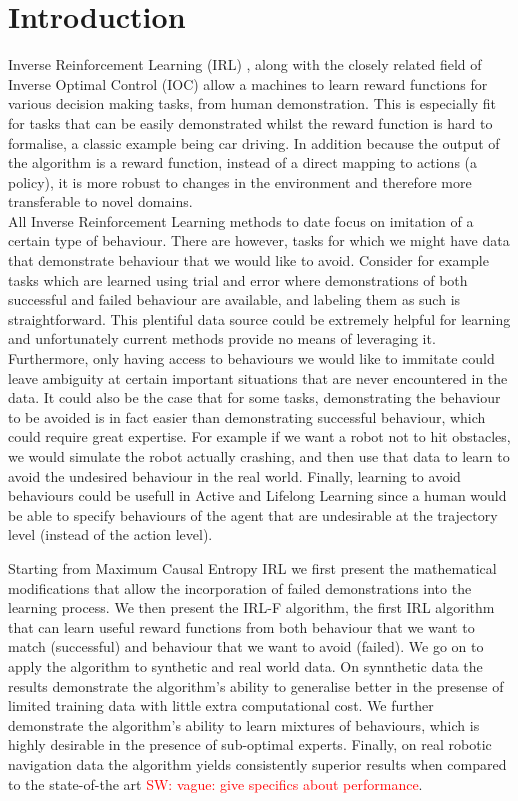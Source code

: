 \documentclass[letterpaper]{article}
\newcommand{\sw}[1]{\textcolor{red}{SW: #1}}
\newcommand{\sw}[1]{}
\begin{document}
\section{Introduction}
	Inverse Reinforcement Learning (IRL) \cite{ng2000algorithms}, along with the closely related field of Inverse Optimal Control (IOC) allow a machines to learn reward functions for various decision making tasks, from human demonstration.  This is especially fit for tasks that can be easily demonstrated whilst the reward function is hard to formalise, a classic example being car driving. In addition because the output of the algorithm is a reward function, instead of a direct mapping to actions (a policy), it is more robust to changes in the environment and therefore more transferable to novel domains.\\
	All Inverse Reinforcement Learning methods to date focus on imitation of a certain type of behaviour. There are however, tasks for which we might have data that demonstrate behaviour that we would like to avoid. Consider for example tasks which are learned using trial and error where demonstrations of both successful and failed behaviour are available, and labeling them as such is straightforward. This plentiful data source could be extremely helpful for learning and unfortunately current methods provide no means of leveraging it. Furthermore, only having access to behaviours we would like to immitate could leave ambiguity at certain important situations that are never encountered in the data. It could also be the case that for some tasks, demonstrating the behaviour to be avoided is in fact easier than demonstrating successful behaviour, which could require great expertise. For example if we want a robot not to hit obstacles, we would simulate the robot actually crashing, and then use that data to learn to avoid the undesired behaviour in the real world. Finally, learning to avoid behaviours could be usefull in Active and Lifelong Learning since a human would be able to specify behaviours of the agent that are undesirable at the trajectory level (instead of the action level). 

	 Starting from Maximum Causal Entropy IRL \cite{ziebart2010modelingthesis} we first present the mathematical modifications that allow the incorporation of failed demonstrations into the learning process. We then present the IRL-F algorithm, the first IRL algorithm that can learn useful reward functions from both behaviour that we want to match (successful) and behaviour that we want to avoid (failed). We go on to apply the algorithm to synthetic and real world data. On synnthetic data the results demonstrate the algorithm's ability to generalise better in the presense of limited training data with little extra computational cost. We further demonstrate the algorithm's ability to learn mixtures of behaviours, which is highly desirable in the presence of sub-optimal experts. Finally, on real robotic navigation data the algorithm yields consistently superior results when compared to the state-of-the art \sw{vague: give specifics about performance}. 
\end{document}
